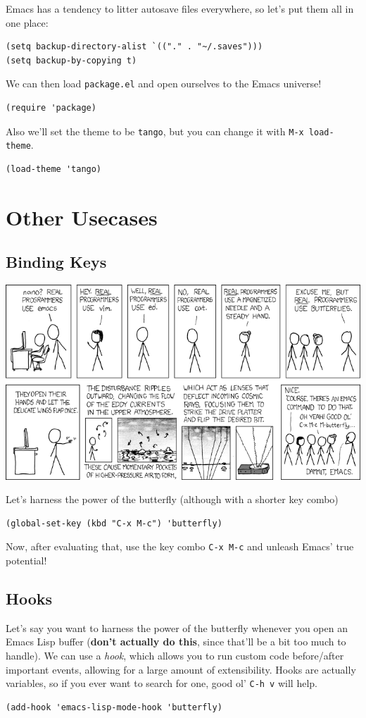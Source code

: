 \documentclass[letterpaper]{article}
\begin{document}
Emacs has a tendency to litter autosave files everywhere, so let's put them all in one place:
\begin{verbatim}
(setq backup-directory-alist `(("." . "~/.saves")))
(setq backup-by-copying t)
\end{verbatim}

We can then load \texttt{package.el} and open ourselves to the Emacs universe!
\begin{verbatim}
(require 'package)
\end{verbatim}

Also we'll set the theme to be \texttt{tango}, but you can change it with  \texttt{M-x load-theme}.
\begin{verbatim}
(load-theme 'tango)
\end{verbatim}


\section{Other Usecases}
\label{sec:org6d2de7f}
\subsection{Binding Keys}
\label{sec:orga727423}
\begin{center}
\includegraphics[width=.9\linewidth]{2021-09-27_22-48-23_screenshot.png}
\end{center}

Let's harness the power of the butterfly (although with a shorter key combo)
\begin{verbatim}
(global-set-key (kbd "C-x M-c") 'butterfly)
\end{verbatim}
Now, after evaluating that, use the key combo \texttt{C-x M-c} and unleash Emacs' true potential! 
\subsection{Hooks}
\label{sec:org4d2e393}
Let's say you want to harness the power of the butterfly whenever you open an Emacs Lisp buffer (\textbf{don't actually do this}, since that'll be a bit too much to handle). We can use a \emph{hook}, which allows you to run custom code before/after important events, allowing for a large amount of extensibility. Hooks are actually variables, so if you ever want to search for one, good ol' \texttt{C-h v} will help.
\begin{verbatim}
(add-hook 'emacs-lisp-mode-hook 'butterfly)
\end{verbatim}
\end{document}
